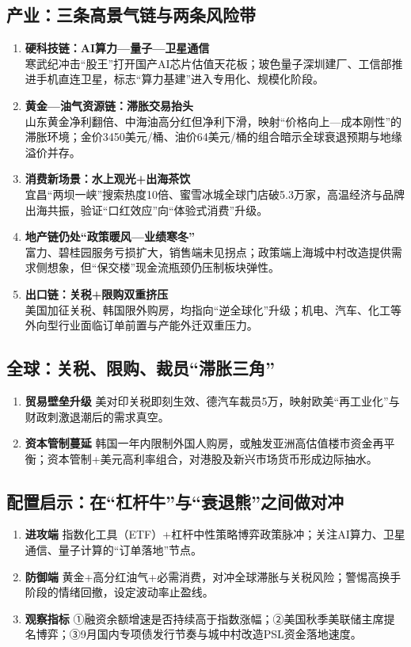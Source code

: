 \subsection{产业：三条高景气链与两条风险带}
\begin{enumerate}[leftmargin=*, nosep]
    \item \textbf{硬科技链：AI算力—量子—卫星通信}  \\
    寒武纪冲击“股王”打开国产AI芯片估值天花板；玻色量子深圳建厂、工信部推进手机直连卫星，标志“算力基建”进入专用化、规模化阶段。
    \item \textbf{黄金—油气资源链：滞胀交易抬头}  \\
    山东黄金净利翻倍、中海油高分红但净利下滑，映射“价格向上—成本刚性”的滞胀环境；金价3450美元/桶、油价64美元/桶的组合暗示全球衰退预期与地缘溢价并存。
    \item \textbf{消费新场景：水上观光+出海茶饮}  \\
    宜昌“两坝一峡”搜索热度10倍、蜜雪冰城全球门店破5.3万家，高温经济与品牌出海共振，验证“口红效应”向“体验式消费”升级。
    \item \textbf{地产链仍处“政策暖风—业绩寒冬”}  \\
    富力、碧桂园服务亏损扩大，销售端未见拐点；政策端上海城中村改造提供需求侧想象，但“保交楼”现金流瓶颈仍压制板块弹性。
    \item \textbf{出口链：关税+限购双重挤压}  \\
    美国加征关税、韩国限外购房，均指向“逆全球化”升级；机电、汽车、化工等外向型行业面临订单前置与产能外迁双重压力。
\end{enumerate}

\subsection{全球：关税、限购、裁员“滞胀三角”}
\begin{enumerate}[leftmargin=*, nosep]
    \item \textbf{贸易壁垒升级}  
    美对印关税即刻生效、德汽车裁员5万，映射欧美“再工业化”与财政刺激退潮后的需求真空。
    \item \textbf{资本管制蔓延}  
    韩国一年内限制外国人购房，或触发亚洲高估值楼市资金再平衡；资本管制+美元高利率组合，对港股及新兴市场货币形成边际抽水。
\end{enumerate}

\subsection{配置启示：在“杠杆牛”与“衰退熊”之间做对冲}
\begin{enumerate}[leftmargin=*, nosep]
    \item \textbf{进攻端}  
    指数化工具（ETF）+杠杆中性策略博弈政策脉冲；关注AI算力、卫星通信、量子计算的“订单落地”节点。
    \item \textbf{防御端}  
    黄金+高分红油气+必需消费，对冲全球滞胀与关税风险；警惕高换手阶段的情绪回撤，设定波动率止盈线。
    \item \textbf{观察指标}  
    ①融资余额增速是否持续高于指数涨幅；②美国秋季美联储主席提名博弈；③9月国内专项债发行节奏与城中村改造PSL资金落地速度。
\end{enumerate}

